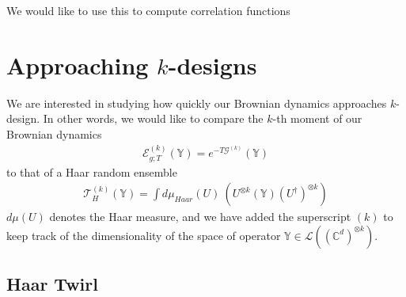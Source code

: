 \documentclass{article}
\theoremstyle{definition}
\newcommand{\lb}{\left(}
\newcommand{\rb}{\right)}
\newcommand{\NL}[1]{\textcolor{blue}{#1}}
\begin{document}
    We would like to use this to compute correlation functions


    \section{Approaching \texorpdfstring{$k$}{k}-designs}

    We are interested in studying how quickly our Brownian dynamics approaches
    $k$-design. In other words, we would like to compare the $k$-th moment of
    our Brownian dynamics
    \begin{eqnarray}
        \mathcal{E}^{(k)}_{g;T}(\mathbb{Y})=e^{-T\mathcal{G}^{(k)}}(\mathbb{Y})
    \end{eqnarray}
    to that of a Haar random ensemble
    \begin{eqnarray}
        \mathcal{T}_H^{(k)}(\mathbb{Y})=\int d\mu_{Haar}(U)\:\lb U^{\otimes k}(\mathbb{Y})(U^\dagger)^{\otimes k}\rb
    \end{eqnarray}
    $d\mu(U)$ denotes the Haar measure, and we have added the superscript $(k)$ to
    keep track of the dimensionality of the space of operator $\mathbb{Y}\in \mathcal{L}
    ((\mathbb{C}^{d})^{\otimes k})$.

    \subsection{Haar Twirl}
    \label{subsec:haar_twirl}
\end{document}
